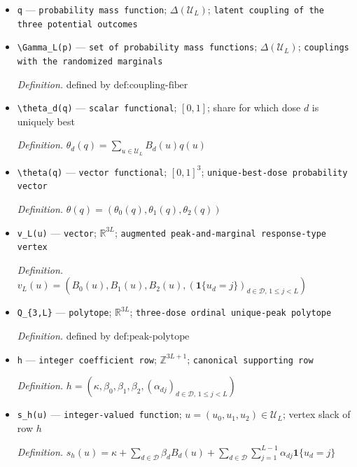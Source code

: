\documentclass{article}
\begin{document}
\begin{itemize}
  \item \texttt{q} --- \texttt{probability mass function}; \(\Delta(\mathcal U_L)\); \texttt{latent coupling of the three potential outcomes}
  \item \texttt{\textbackslash{}\allowbreak{}Gamma\_\allowbreak{}L(p)} --- \texttt{set of probability mass functions}; \(\Delta(\mathcal U_L)\); \texttt{couplings with the randomized marginals}
  \par\smallskip\noindent\emph{Definition.} defined by \(\text{def:coupling-fiber}\)
  \item \texttt{\textbackslash{}\allowbreak{}theta\_\allowbreak{}d(q)} --- \texttt{scalar functional}; \([0,1]\); share for which dose \(d\) is uniquely best
  \par\smallskip\noindent\emph{Definition.} \(\theta_d(q)=\sum_{u\in\mathcal U_L}B_d(u)q(u)\)
  \item \texttt{\textbackslash{}\allowbreak{}theta(q)} --- \texttt{vector functional}; \([0,1]^3\); \texttt{unique-\allowbreak{}best-\allowbreak{}dose probability vector}
  \par\smallskip\noindent\emph{Definition.} \(\theta(q)=(\theta_0(q),\theta_1(q),\theta_2(q))\)
  \item \texttt{v\_\allowbreak{}L(u)} --- \texttt{vector}; \(\mathbb R^{3L}\); \texttt{augmented peak-\allowbreak{}and-\allowbreak{}marginal response-\allowbreak{}type vertex}
  \par\smallskip\noindent\emph{Definition.} \(v_L(u)=(B_0(u),B_1(u),B_2(u),(\mathbf 1\{u_d=j\})_{d\in\mathcal D,\,1\le j<L})\)
  \item \texttt{Q\_\allowbreak{}\{3,\allowbreak{}L\}\allowbreak{}} --- \texttt{polytope}; \(\mathbb R^{3L}\); \texttt{three-\allowbreak{}dose ordinal unique-\allowbreak{}peak polytope}
  \par\smallskip\noindent\emph{Definition.} defined by \(\text{def:peak-polytope}\)
  \item \texttt{h} --- \texttt{integer coefficient row}; \(\mathbb Z^{3L+1}\); \texttt{canonical supporting row}
  \par\smallskip\noindent\emph{Definition.} \(h=(\kappa,\beta_0,\beta_1,\beta_2,(\alpha_{dj})_{d\in\mathcal D,\,1\le j<L})\)
  \item \texttt{s\_\allowbreak{}h(u)} --- \texttt{integer-\allowbreak{}valued function}; \(u=(u_0,u_1,u_2)\in\mathcal U_L\); vertex slack of row \(h\)
  \par\smallskip\noindent\emph{Definition.} \(s_h(u)=\kappa+\sum_{d\in\mathcal D}\beta_dB_d(u)+\sum_{d\in\mathcal D}\sum_{j=1}^{L-1}\alpha_{dj}\mathbf 1\{u_d=j\}\)

\end{itemize}
\end{document}
